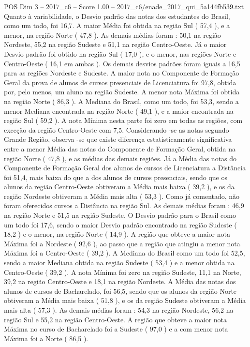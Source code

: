 \begin{textsample}{POS Dim 3 – 2017\_c6 – Score 1.00 – 2017\_c6/enade\_2017\_qui\_5a144fb539.txt}
Quanto à variabilidade, o Desvio padrão das notas dos estudantes do Brasil, como um todo, foi 16,7.
A maior Média foi obtida na região Sul ( 57,4 ), e a menor, na região Norte ( 47,8 ).
As demais médias foram : 50,1 na região Nordeste, 55,2 na região Sudeste e 51,1 na região Centro-Oeste.
Já o maior Desvio padrão foi obtido na região Sul ( 17,0 ), e o menor, nas regiões Norte e Centro-Oeste ( 16,1 em ambas ).
Os demais desvios padrões foram iguais a 16,5 para as regiões Nordeste e Sudeste.
A maior nota no Componente de Formação Geral da prova de alunos de cursos presenciais de Licenciatura foi 97,8, obtida por, pelo menos, um aluno na região Sudeste.
A menor nota Máxima foi obtida na região Norte ( 86,3 ).
A Mediana do Brasil, como um todo, foi 53,3, sendo a menor Mediana encontrada na região Norte ( 49,1 ), e a maior encontrada na região Sul ( 59,2 ).
A nota Mínima nesta parte foi zero em todas as regiões, com exceção da região Centro-Oeste com 7,5.
Considerando -se as notas segundo Grande Região, observa -se que existe diferença estatisticamente significativa entre a menor Média das notas do Componente de Formação Geral, obtida na região Norte ( 47,8 ), e as médias das demais regiões.
Já a Média das notas do Componente de Formação Geral dos alunos de cursos de Licenciatura a Distância foi 51,4, mais baixa do que a dos alunos de cursos presenciais, sendo que os alunos da região Centro-Oeste obtiveram a Média mais baixa ( 39,2 ), e os da região Nordeste obtiveram a Média mais alta ( 53,3 ).
Como já comentado, não foram oferecidos cursos a Distância na região Sul.
As demais médias foram : 46,9 na região Norte e 51,5 na região Sudeste.
O Desvio padrão para o Brasil como um todo foi 17,6, sendo o maior Desvio padrão encontrado na região Sudeste ( 18,2 ) e o menor, na região Norte ( 14,9 ).
A região que obteve a maior nota Máxima foi a Nordeste ( 92,6 ), ao passo que a região que atingiu a menor nota Máxima foi a Centro-Oeste ( 39,2 ).
A Mediana do Brasil como um todo foi 52,5, sendo a maior Mediana obtida na região Sudeste ( 53,4 ) e a menor obtida na Centro-Oeste ( 39,2 ).
A nota Mínima foi zero na região Sudeste, 11,1 na Norte, 39,2 na região Centro-Oeste e 18,1 na região Nordeste.
A Média das notas dos alunos de cursos de Bacharelado, foi 56,5, sendo que os alunos da região Norte obtiveram a Média mais baixa ( 51,8 ), e os da região Sudeste obtiveram a Média mais alta ( 57,3 ).
As demais médias foram : 54,3 na região Nordeste, 56,2 na região Sul e 55,2 na região Centro-Oeste.
A região que obteve a maior nota Máxima no curso de Bacharelado foi a Sudeste ( 97,0 ) e a com menor nota Máxima foi a Norte ( 86,5 ).

\end{textsample}

